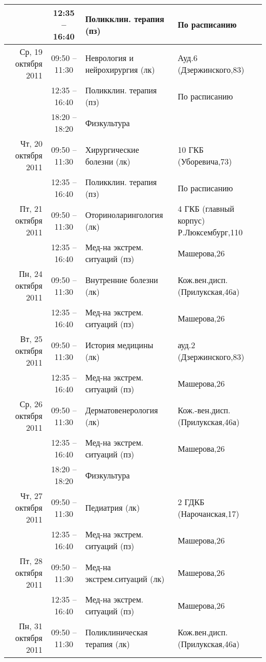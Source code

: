 \documentclass[a4paper,10pt,notitlepage]{report}
\begin{document}
\begin{center}
{\begin{longtable}{r|c|l|l|}
  & 12:35 -- 16:40 & Поликклин. терапия (пз) & По расписанию \\ \cline{2-4}
\hline Ср, 19 октября 2011
  & 09:50 -- 11:30 & Неврология и нейрохирургия (лк) & Ауд.6 (Дзержинского,83) \\ \cline{2-4}
  & 12:35 -- 16:40 & Поликклин. терапия (пз) & По расписанию \\ \cline{2-4}
  & 18:20 -- 18:20 & Физкультура  &  \\ \cline{2-4}
\hline Чт, 20 октября 2011
  & 09:50 -- 11:30 & Хирургические болезни (лк) & 10 ГКБ (Уборевича,73) \\ \cline{2-4}
  & 12:35 -- 16:40 & Поликклин. терапия (пз) & По расписанию \\ \cline{2-4}
\hline Пт, 21 октября 2011
  & 09:50 -- 11:30 & Оториноларингология (лк) & 4 ГКБ (главный корпус) Р.Люксембург,110 \\ \cline{2-4}
  & 12:35 -- 16:40 & Мед-на экстрем. ситуаций (пз) & Машерова,26 \\ \cline{2-4}
\hline Пн, 24 октября 2011
  & 09:50 -- 11:30 & Внутренние болезни (лк) & Кож.вен.дисп.(Прилукская,46а) \\ \cline{2-4}
  & 12:35 -- 16:40 & Мед-на экстрем. ситуаций (пз) & Машерова,26 \\ \cline{2-4}
\hline Вт, 25 октября 2011
  & 09:50 -- 11:30 & История медицины (лк) & ауд.2 (Дзержинского,83) \\ \cline{2-4}
  & 12:35 -- 16:40 & Мед-на экстрем. ситуаций (пз) & Машерова,26 \\ \cline{2-4}
\hline Ср, 26 октября 2011
  & 09:50 -- 11:30 & Дерматовенерология (лк) & Кож.-вен.дисп.(Прилукская,46а) \\ \cline{2-4}
  & 12:35 -- 16:40 & Мед-на экстрем. ситуаций (пз) & Машерова,26 \\ \cline{2-4}
  & 18:20 -- 18:20 & Физкультура  &  \\ \cline{2-4}
\hline Чт, 27 октября 2011
  & 09:50 -- 11:30 & Педиатрия (лк) & 2 ГДКБ (Нарочанская,17) \\ \cline{2-4}
  & 12:35 -- 16:40 & Мед-на экстрем. ситуаций (пз) & Машерова,26 \\ \cline{2-4}
\hline Пт, 28 октября 2011
  & 09:50 -- 11:30 & Мед-на экстрем.ситуаций (лк) & Машерова,26 \\ \cline{2-4}
  & 12:35 -- 16:40 & Мед-на экстрем. ситуаций (пз) & Машерова,26 \\ \cline{2-4}
\hline Пн, 31 октября 2011
  & 09:50 -- 11:30 & Поликлиническая терапия (лк) & Кож.вен.дисп.(Прилукская,46а) \\ \cline{2-4}

\end{longtable}}
\end{center}
\end{document}
